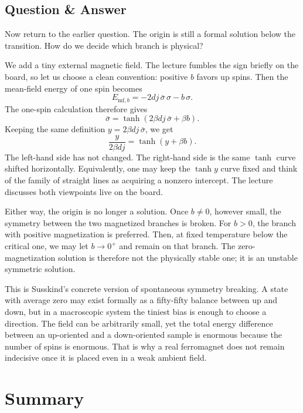 \subsection{Question \& Answer}

Now return to the earlier question. The origin is still a formal solution below the transition. How do we decide which branch is physical?

We add a tiny external magnetic field. The lecture fumbles the sign briefly on the board, so let us choose a clean convention: positive \(b\) favors up spins. Then the mean-field energy of one spin becomes
\begin{equation}
E_{\text{mf},b}=-2dj\,\bar{\sigma}\,\sigma-b\,\sigma.
\end{equation}
The one-spin calculation therefore gives
\begin{equation}
\bar{\sigma}=\tanh(2\beta d j\,\bar{\sigma}+\beta b).
\end{equation}
Keeping the same definition \(y=2\beta d j\,\bar{\sigma}\), we get
\begin{equation}
\frac{y}{2\beta d j}=\tanh(y+\beta b).
\end{equation}
The left-hand side has not changed. The right-hand side is the same \(\tanh\) curve shifted horizontally. Equivalently, one may keep the \(\tanh y\) curve fixed and think of the family of straight lines as acquiring a nonzero intercept. The lecture discusses both viewpoints live on the board.

Either way, the origin is no longer a solution. Once \(b\neq0\), however small, the symmetry between the two magnetized branches is broken. For \(b>0\), the branch with positive magnetization is preferred. Then, at fixed temperature below the critical one, we may let \(b\to0^+\) and remain on that branch. The zero-magnetization solution is therefore not the physically stable one; it is an unstable symmetric solution.

This is Susskind's concrete version of spontaneous symmetry breaking. A state with average zero may exist formally as a fifty-fifty balance between up and down, but in a macroscopic system the tiniest bias is enough to choose a direction. The field can be arbitrarily small, yet the total energy difference between an up-oriented and a down-oriented sample is enormous because the number of spins is enormous. That is why a real ferromagnet does not remain indecisive once it is placed even in a weak ambient field.

\section{Summary}


